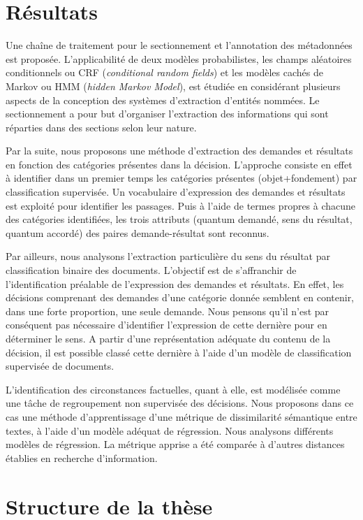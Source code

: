 \section{Résultats}
\label{sec:intro:résultats}
Une chaîne de traitement pour le sectionnement et l'annotation des métadonnées est proposée. L'applicabilité de deux modèles probabilistes, les champs aléatoires conditionnels ou CRF (\textit{conditional random fields}) et les modèles cachés de Markov ou HMM (\textit{hidden Markov Model}), est étudiée en considérant plusieurs aspects de la conception des systèmes d'extraction d'entités nommées. Le sectionnement a pour but d'organiser l'extraction des informations qui sont réparties dans des sections selon leur nature. 

Par la suite, nous proposons une méthode d'extraction des demandes et résultats en fonction des catégories présentes dans la décision. L'approche consiste en effet à identifier dans un premier temps les catégories présentes (objet+fondement) par classification supervisée. Un vocabulaire d'expression des demandes et résultats est exploité pour identifier les passages. Puis à l'aide de termes propres à chacune des catégories identifiées, les trois attributs (quantum demandé, sens du résultat, quantum accordé) des paires demande-résultat sont reconnus. 

Par ailleurs, nous analysons l'extraction particulière du sens du résultat par classification binaire des documents. L'objectif est de s'affranchir de l'identification préalable de l'expression des demandes et résultats. En effet, les décisions comprenant des demandes d'une catégorie donnée semblent en contenir, dans une forte proportion, une seule demande. Nous pensons qu'il n'est par conséquent pas nécessaire d'identifier l'expression de cette dernière pour en déterminer le sens. A partir d'une représentation adéquate du contenu de la décision, il est possible classé cette dernière à l'aide d'un modèle de classification supervisée de documents.

L'identification des circonstances factuelles, quant à elle, est modélisée comme une tâche de regroupement non supervisée des décisions. Nous proposons dans ce cas une méthode d'apprentissage d'une métrique de dissimilarité sémantique entre textes, à l'aide d'un modèle adéquat de régression. Nous analysons différents modèles de régression. La métrique apprise a été comparée à d'autres distances établies en recherche d'information.

\section{Structure de la thèse}
\label{sec:intro:organisation}

